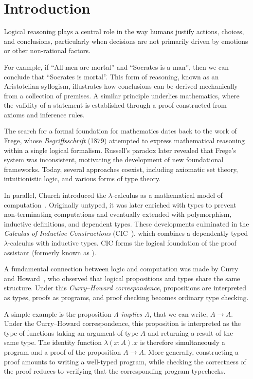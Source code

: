 \chapter{Introduction}

Logical reasoning plays a central role in the way humans justify actions,
choices, and conclusions, particularly when decisions are not primarily driven
by emotions or other non-rational factors.

For example, if ``All men are mortal'' and ``Socrates is a man'', then we can
conclude that ``Socrates is mortal''. This form of reasoning, known as an
Aristotelian syllogism, illustrates how conclusions can be derived
mechanically from a collection of premises. A similar principle underlies
mathematics, where the validity of a statement is established through a proof
constructed from axioms and inference rules.

The search for a formal foundation for mathematics dates back to the work of
Frege, whose \emph{Begriffsschrift} (1879) attempted to express mathematical
reasoning within a single logical formalism. Russell's paradox later revealed
that Frege's system was inconsistent, motivating the development of new
foundational frameworks. Today, several approaches coexist, including
axiomatic set theory, intuitionistic logic, and various forms of type theory.

In parallel, Church introduced the $\lambda$-calculus as a mathematical model
of computation~\cite{church}. Originally untyped, it was later enriched with
types to prevent non-terminating computations and eventually extended with
polymorphism, inductive definitions, and dependent types. These developments
culminated in the \emph{Calculus of Inductive Constructions} (CIC~\cite{cic}), 
which combines a dependently typed
$\lambda$-calculus with inductive types. CIC forms the logical foundation of
the \rocq proof assistant (formerly known as \coq).

A fundamental connection between logic and computation was made by Curry and
Howard~\cite{Howard-correspondance}, who observed that logical propositions
and types share the same structure. Under this
\emph{Curry--Howard correspondence}, propositions are interpreted as types,
proofs as programs, and proof checking becomes ordinary type checking.

A simple example is the proposition \textit{A implies A}, that we can write,
$ A \rightarrow A. $
Under the Curry--Howard correspondence, this proposition is interpreted as the
type of functions taking an argument of type \(A\) and returning a result of
the same type. The identity function
$ \lambda (x:A).x $
is therefore simultaneously a program and a proof of the proposition
\(A \rightarrow A\). More generally, constructing a proof amounts to writing a
well-typed program, while checking the correctness of the proof reduces to
verifying that the corresponding program typechecks.

